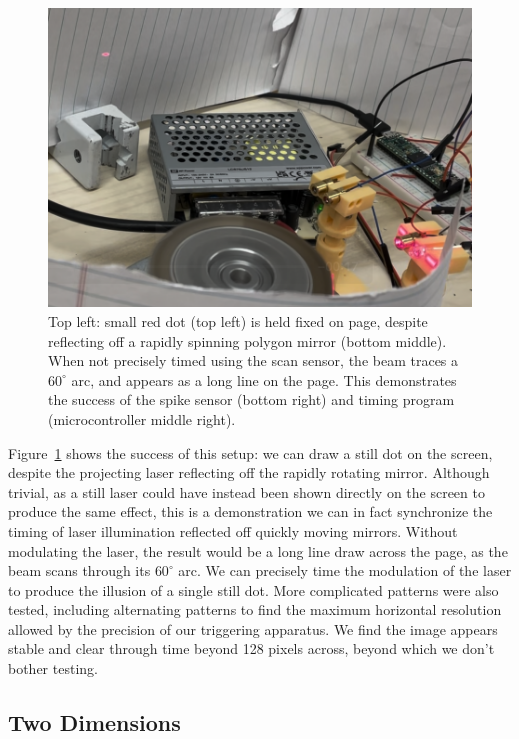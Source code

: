 \documentclass[twocolumn]{revtex4-2}
\begin{document}
\begin{figure}
    \centering
    \includegraphics[width=0.95\linewidth]{still-dot.png}
    \caption[Still Dot]{Top left: small red dot (top left) is held fixed on page, despite reflecting off a rapidly spinning polygon mirror (bottom middle). When not precisely timed using the scan sensor, the beam traces a $60^{\circ}$ arc, and appears as a long line on the page. This demonstrates the success of the spike sensor (bottom right) and timing program (microcontroller middle right).}
    \label{fig:still-dot}
\end{figure}



Figure~\ref{fig:still-dot} shows the success of this setup: we can draw a still dot on the screen, despite the projecting laser reflecting off the rapidly rotating mirror. Although trivial, as a still laser could have instead been shown directly on the screen to produce the same effect, this is a demonstration we can in fact synchronize the timing of laser illumination reflected off quickly moving mirrors. Without modulating the laser, the result would be a long line draw across the page, as the beam scans through its $60^{\circ}$ arc. We can precisely time the modulation of the laser to produce the illusion of a single still dot. More complicated patterns were also tested, including alternating patterns to find the maximum horizontal resolution allowed by the precision of our triggering apparatus. We find the image appears stable and clear through time beyond 128 pixels across, beyond which we don't bother testing.


\subsection{Two Dimensions} \label{2d}
\end{document}
